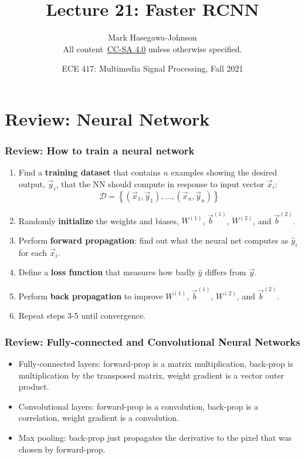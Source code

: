 \documentclass{beamer}
\title{Lecture 21: Faster RCNN}
\author{Mark Hasegawa-Johnson\\All content~\href{https://creativecommons.org/licenses/by-sa/4.0/}{CC-SA 4.0} unless otherwise specified.}
\date{ECE 417: Multimedia Signal Processing, Fall 2021}
\begin{document}
\begin{frame}
  \maketitle
\end{frame}

\begin{frame}
  \tableofcontents
\end{frame}


\section[Review]{Review: Neural Network}
\setcounter{subsection}{1}

\begin{frame}
  \frametitle{Review: How to train a neural network}
  \begin{enumerate}
  \item Find a {\bf training dataset} that contains $n$ examples showing the
    desired output, $\vec{y}_i$, that the NN should compute in
    response to input vector $\vec{x}_i$:
    \[
    {\mathcal D}=\left\{(\vec{x}_1,\vec{y}_1),\ldots,(\vec{x}_n,\vec{y}_n)\right\}
    \]
    \item Randomly {\bf initialize} the weights and biases, $W^{(1)}$,
      $\vec{b}^{(1)}$, $W^{(2)}$, and $\vec{b}^{(2)}$.
    \item Perform {\bf forward propagation}: find out what the neural
      net computes as $\hat{y}_i$ for each $\vec{x}_i$.
    \item Define a {\bf loss function} that measures
      how badly $\hat{y}$ differs from $\vec{y}$.
    \item Perform {\bf back propagation} to improve $W^{(1)}$,
      $\vec{b}^{(1)}$, $W^{(2)}$, and $\vec{b}^{(2)}$.
    \item Repeat steps 3-5 until convergence.
  \end{enumerate}
\end{frame}

\begin{frame}
  \frametitle{Review: Fully-connected and Convolutional Neural Networks}
  \begin{itemize}
  \item Fully-connected layers: forward-prop is a matrix multiplication, back-prop
    is multiplication by the transposed matrix, weight gradient is a vector outer product.
  \item Convolutional layers: forward-prop is a convolution, back-prop
    is a correlation, weight gradient is a convolution.
  \item Max pooling: back-prop just propagates the derivative to the
    pixel that was chosen by forward-prop.
  \end{itemize}
\end{frame}
\end{document}
